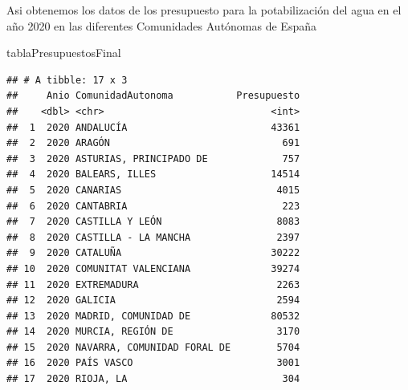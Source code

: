 \documentclass[
]{article}
\newenvironment{Shaded}{\begin{snugshade}}{\end{snugshade}}
\newcommand{\NormalTok}[1]{#1}
\begin{document}
Asi obtenemos los datos de los presupuesto para la potabilización del
agua en el año 2020 en las diferentes Comunidades Autónomas de España

\begin{Shaded}
\begin{Highlighting}[]
\NormalTok{tablaPresupuestosFinal}
\end{Highlighting}
\end{Shaded}

\begin{verbatim}
## # A tibble: 17 x 3
##     Anio ComunidadAutonoma           Presupuesto
##    <dbl> <chr>                             <int>
##  1  2020 ANDALUCÍA                         43361
##  2  2020 ARAGÓN                              691
##  3  2020 ASTURIAS, PRINCIPADO DE             757
##  4  2020 BALEARS, ILLES                    14514
##  5  2020 CANARIAS                           4015
##  6  2020 CANTABRIA                           223
##  7  2020 CASTILLA Y LEÓN                    8083
##  8  2020 CASTILLA - LA MANCHA               2397
##  9  2020 CATALUÑA                          30222
## 10  2020 COMUNITAT VALENCIANA              39274
## 11  2020 EXTREMADURA                        2263
## 12  2020 GALICIA                            2594
## 13  2020 MADRID, COMUNIDAD DE              80532
## 14  2020 MURCIA, REGIÓN DE                  3170
## 15  2020 NAVARRA, COMUNIDAD FORAL DE        5704
## 16  2020 PAÍS VASCO                         3001
## 17  2020 RIOJA, LA                           304
\end{verbatim}
\end{document}
